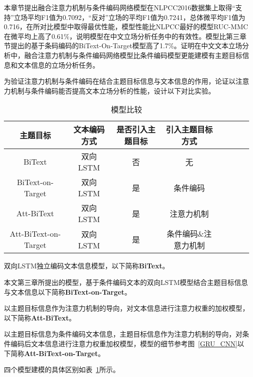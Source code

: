 本章节提出融合注意力机制与条件编码网络模型在NLPCC2016数据集上取得“支持”立场平均F1值为0.7092，“反对”立场的平均F1值为0.7241，总体微平均F1值为0.716，在所对比模型中取得最优性能，模型性能比NLPCC最好的模型RUC-MMC在微平均上高了0.61\%，说明模型在中文立场分析任务中的有效性。模型比第三章节提出的基于条码编码的BiText-On-Target模型高了1.7\%。证明在中文文本立场分析中，融合注意力机制与条件编码网络模型比条件编码模型更能建模有主题目标信息和文本信息的立场分析任务。

为验证注意力机制与条件编码在结合主题目标信息与文本信息的作用，论证以注意力机制与条件编码能否提高文本立场分析的性能，设计以下对比实验。
\begin{table}[htbp]
	\caption[table123]{模型比较}
	\label{model_list_attention}
	\vspace{0.5em}\centering\wuhao
	\begin{tabular}{cccccccc}
		\toprule[1.5pt]
		主题目标&文本编码方式&是否引入主题目标&引入主题目标方式 \\
		\midrule[1pt]
		BiText&双向LSTM&否&无\\
		BiText-on-Target&双向LSTM&是&条件编码\\
		Att-BiText&双向LSTM&是&注意力机制\\
		Att-BiText-on-Target&双向LSTM&是&条件编码\&注意力机制\\
		\bottomrule[1.5pt]
	\end{tabular}
\end{table}

双向LSTM独立编码文本信息模型，以下简称\textbf{BiText}。

本文第三章所提出的模型，基于条件编码文本的双向LSTM模型结合主题目标信息与文本信息以下简称\textbf{BiText-on-Target}。

以主题目标信息作为注意力机制的导向，对文本信息进行注意力权重的加权模型，以下简称\textbf{Att-BiText}。

以主题目标信息为条件编码文本信息，主题目标信息作为注意力机制的导向，对条件编码后文本信息进行注意力权重加权模型，模型的细节参考图~\ref{GRU_CNN}以下简称\textbf{Att-BiText-on-Target}。

四个模型建模的具体区别如表~\ref{model_list_attention}所示。

